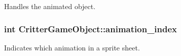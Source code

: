Handles the animated object. 

\hypertarget{class_critter_game_object_a24da2fb9666d41d47a736278f9305d95}{
\subsubsection[{animation\+\_\+index}]{\setlength{\rightskip}{0pt plus 5cm}int Critter\+Game\+Object\+::animation\+\_\+index\hspace{0.3cm}{\ttfamily [protected]}}}\label{class_critter_game_object_a24da2fb9666d41d47a736278f9305d95}


Indicates which animation in a sprite sheet. 

